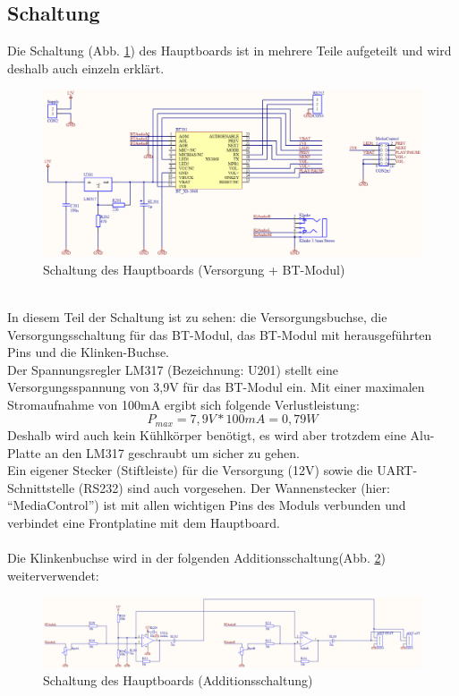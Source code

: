 \subsection{Schaltung}
Die Schaltung (Abb. \ref{fig:abb3.3}) des Hauptboards ist in mehrere Teile aufgeteilt und wird deshalb auch einzeln erklärt.
\begin{figure} [h]
	\centering
	\includegraphics[width=1\textwidth]{schaltungen/hauptboard_sch1.png}
	\caption{Schaltung des Hauptboards (Versorgung + BT-Modul)}\label {fig:abb3.3}
\end{figure} \\
In diesem Teil der Schaltung ist zu sehen: die Versorgungsbuchse, die Versorgungsschaltung für das BT-Modul, das BT-Modul mit herausgeführten Pins und die Klinken-Buchse.\\
Der Spannungsregler LM317 (Bezeichnung: U201) stellt eine Versorgungsspannung von 3,9V für das BT-Modul ein. Mit einer maximalen Stromaufnahme von 100mA ergibt sich folgende Verlustleistung:
\begin{equation}
	P_{max} = 7,9V * 100mA = 0,79W
\end{equation}
Deshalb wird auch kein Kühlkörper benötigt, es wird aber trotzdem eine Alu-Platte an den LM317 geschraubt um sicher zu gehen. \\
Ein eigener Stecker (Stiftleiste) für die Versorgung (12V) sowie die UART-Schnittstelle (RS232) sind auch vorgesehen. Der Wannenstecker (hier: \enquote{MediaControl}) ist mit allen wichtigen Pins des Moduls verbunden und verbindet eine Frontplatine mit dem Hauptboard. \\ \\
Die Klinkenbuchse wird in der folgenden Additionsschaltung(Abb. \ref {fig:abb3.4}) weiterverwendet:
\begin{figure} [h]
	\centering
	\includegraphics[width=1\textwidth]{schaltungen/hauptboard_sch2.png}
	\caption{Schaltung des Hauptboards (Additionsschaltung)}\label {fig:abb3.4}
\end{figure} \\
